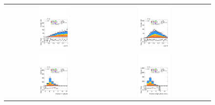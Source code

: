 \begin{figure}[htbp]
\begin{tabular}{@{}c c c@{}}
    \includegraphics[width=0.33\textwidth]{images/plots_modelling_run2_run3_variables/run_2_tth/plot_ratio12_hh_tth_15_16_17_18.pdf} &
    \includegraphics[width=0.33\textwidth]{images/plots_modelling_run2_run3_variables/run_2_tth/plot_ratio13_hh_tth_15_16_17_18.pdf} \\[4pt]
    \includegraphics[width=0.33\textwidth]{images/plots_modelling_run2_run3_variables/run_2_tth/plot_n_ljets_hh_tth_15_16_17_18.pdf} &
    \includegraphics[width=0.33\textwidth]{images/plots_modelling_run2_run3_variables/run_2_tth/plot_n_ljets_maxSameEta_hh_tth_15_16_17_18.pdf} &

\end{tabular}
\end{figure}
